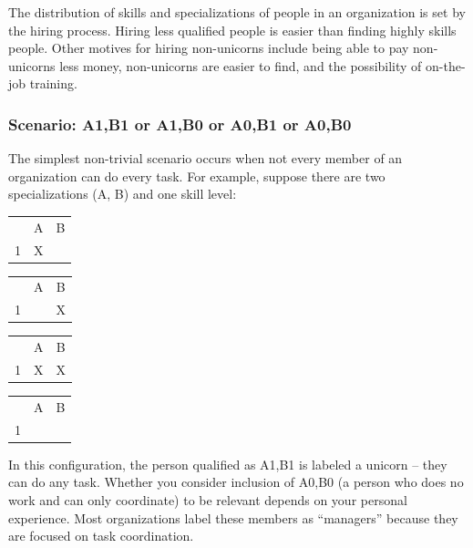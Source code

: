 The distribution of skills and specializations of people in an organization is set by the hiring process. Hiring less qualified people is easier than finding highly skills people. Other motives for hiring non-unicorns include being able to pay non-unicorns less money, non-unicorns are easier to find, and the possibility of on-the-job training.



\subsubsection*{Scenario: A1,B1 or A1,B0 or A0,B1 or A0,B0}

The simplest non-trivial scenario occurs when not every member of an organization can do every task. For example, suppose  there are two specializations (A, B) and one skill level: 

\begin{center}
\begin{tabular}{c|c|c|}
  & A & B \\
\cline{2-3}
1 & X &   \\
\cline{2-3}
\end{tabular} \quad
\begin{tabular}{c|c|c|}
  & A & B \\
\cline{2-3}
1 &   & X \\
\cline{2-3}
\end{tabular} \quad
\begin{tabular}{c|c|c|}
  & A & B \\
\cline{2-3}
1 & X & X \\
\cline{2-3}
\end{tabular} \quad
\begin{tabular}{c|c|c|}
  & A & B \\
\cline{2-3}
1 &   &   \\
\cline{2-3}
\end{tabular}
\end{center}
In this configuration, the person qualified as A1,B1 is labeled a unicorn -- they can do any task. Whether you consider inclusion of A0,B0 (a person who does no work and can only coordinate) to be relevant depends on your personal experience. Most organizations label these members as ``managers'' because they are focused on task coordination.

